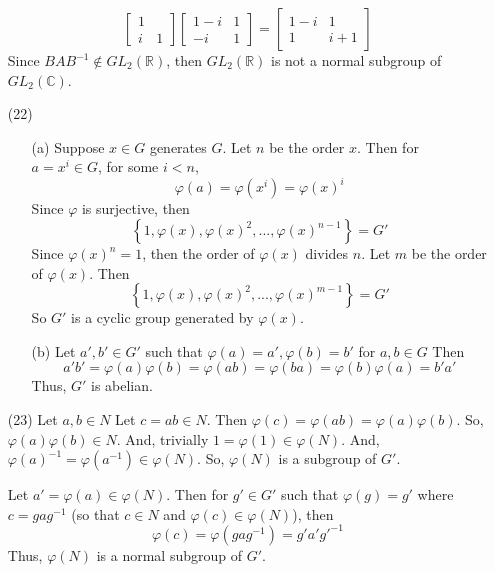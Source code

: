 \begin{itemize}
$$\begin{bmatrix}
1 \\
i & 1
\end{bmatrix}\begin{bmatrix}
1 - i & 1\\
-i & 1
\end{bmatrix} = \begin{bmatrix}
1-i & 1 \\
1 & i+1
\end{bmatrix}$$
Since $BAB^{-1} \not \in GL_2(\mathbb{R})$, then $GL_2(\mathbb{R})$ is not a normal subgroup of $GL_2(\mathbb{C})$.
\item[(22)]
\begin{itemize}
\item[(a)]
Suppose $x \in G$ generates $G$. Let $n$ be the order $x$. Then for $a = x^i \in G$, for some $i < n$,
$$\varphi(a) = \varphi(x^i) = \varphi(x)^i$$
Since $\varphi$ is surjective, then
$$\left\lbrace 1, \varphi(x), \varphi(x)^2, ..., \varphi(x)^{n-1} \right\rbrace = G'$$
Since $\varphi(x)^n = 1$, then the order of $\varphi(x)$ divides $n$. Let $m$ be the order of $\varphi(x)$. Then
$$\left\lbrace 1, \varphi(x), \varphi(x)^2, ..., \varphi(x)^{m-1} \right\rbrace = G'$$
So $G'$ is a cyclic group generated by $\varphi(x)$.
\item[(b)]
Let $a', b' \in G'$ such that $\varphi(a) = a', \varphi(b) = b'$ for $a, b \in G$ Then
$$a'b' = \varphi(a)\varphi(b) = \varphi(ab) = \varphi(ba) = \varphi(b)\varphi(a) = b'a'$$
Thus, $G'$ is abelian.
\end{itemize}
\item[(23)]
Let $a, b \in N$ Let $c = ab \in N$. Then $\varphi(c) = \varphi(ab) = \varphi(a)\varphi(b)$. So, $\varphi(a)\varphi(b) \in N$. And, trivially $1 = \varphi(1) \in \varphi(N)$. And, $\varphi(a)^{-1} = \varphi(a^{-1}) \in \varphi(N)$. So, $\varphi(N)$ is a subgroup of $G'$.

Let $a' = \varphi(a) \in \varphi(N)$. Then for $g' \in G'$ such that $\varphi(g) = g'$ where $c = gag^{-1}$ (so that $c \in N$ and $\varphi(c) \in \varphi(N)$), then
$$\varphi(c) = \varphi(gag^{-1}) = g'a'g'^{-1}$$
Thus, $\varphi(N)$ is a normal subgroup of $G'$.
\end{itemize}
%